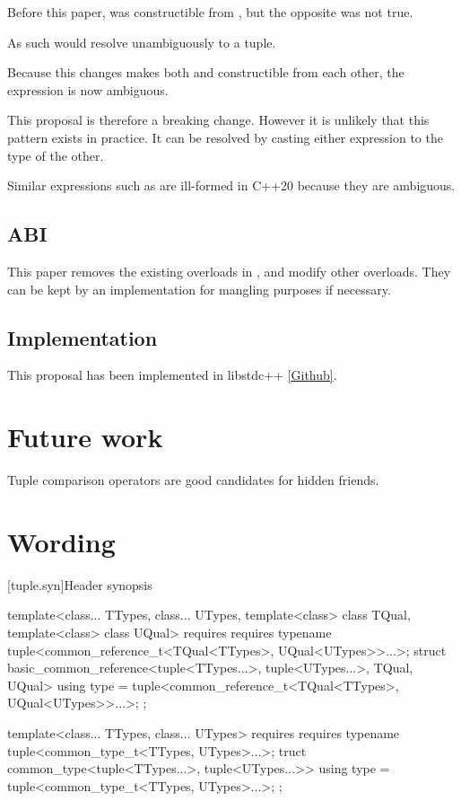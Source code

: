 \documentclass{wg21}
\begin{document}
Before this paper,  was constructible from ,
but the opposite was not true.

As such  would resolve unambiguously to a tuple.

Because this changes makes both  and  constructible from each other,
the expression is now ambiguous.

This proposal is therefore a breaking change.
However it is unlikely that this pattern exists in practice.
It can be resolved by casting either expression to the type of the other.

Similar expressions such as  are ill-formed in C++20 because they are ambiguous.

\subsection{ABI}

This paper removes the existing  overloads in , and modify other overloads.
They can be kept by an implementation for mangling purposes if necessary.

\subsection{Implementation}

This proposal has been implemented in libstdc++ \href{https://github.com/cor3ntin/gcc/tree/tuple_pair2}{[Github]}.

\section{Future work}

Tuple comparison operators are good candidates for hidden friends.

\section{Wording}


[tuple.syn]{Header  synopsis}


\begin{removedblock}
\begin{codeblock}
template<class... TTypes, class... UTypes, template<class> class TQual, template<class> class UQual>
requires requires { typename tuple<common_reference_t<TQual<TTypes>, UQual<UTypes>>...>; }
struct basic_common_reference<tuple<TTypes...>, tuple<UTypes...>, TQual, UQual> {
    using type = tuple<common_reference_t<TQual<TTypes>, UQual<UTypes>>...>;
};

template<class... TTypes, class... UTypes>
requires requires { typename tuple<common_type_t<TTypes, UTypes>...>; }
truct common_type<tuple<TTypes...>, tuple<UTypes...>> {
    using type = tuple<common_type_t<TTypes, UTypes>...>;
};
\end{codeblock}
\end{removedblock}
\end{document}
